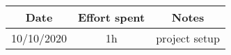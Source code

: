 \documentclass[../../main.tex]{subfiles}
\begin{document}
    \begin{center}
        \begin{tabular}{|c| |c| |c|} 
            \hline
            Date & Effort spent & Notes\\ [0.5ex] 
            \hline\hline
            10/10/2020 & 1h & project setup\\ 
            \hline
        \end{tabular}
    \end{center}
\end{document}
